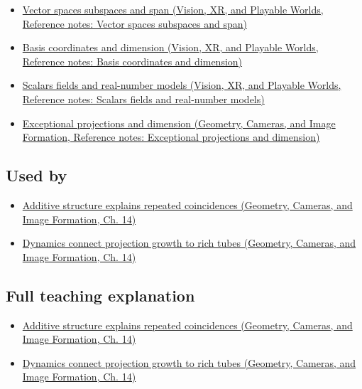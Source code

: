 \begin{itemize}
\tightlist
\item
  \href{../07-Vision-XR-and-Playable-Worlds/main.pdf\#nameddest=appendix-173b52c063ae}{Vector spaces subspaces and span (Vision, XR, and Playable Worlds, Reference notes: Vector spaces subspaces and span)}
\item
  \href{../07-Vision-XR-and-Playable-Worlds/main.pdf\#nameddest=appendix-ce0341f7ea0d}{Basis coordinates and dimension (Vision, XR, and Playable Worlds, Reference notes: Basis coordinates and dimension)}
\item
  \href{../07-Vision-XR-and-Playable-Worlds/main.pdf\#nameddest=appendix-52051ad550fe}{Scalars fields and real-number models (Vision, XR, and Playable Worlds, Reference notes: Scalars fields and real-number models)}
\item
  \href{../03-Geometry-Cameras-and-Image-Formation/main.pdf\#nameddest=appendix-3c73f7862157}{Exceptional projections and dimension (Geometry, Cameras, and Image Formation, Reference notes: Exceptional projections and dimension)}
\end{itemize}

\subsection{Used by}\label{appendix-b0732b22e7d6-used-by}

\begin{itemize}
\tightlist
\item
  \href{../03-Geometry-Cameras-and-Image-Formation/main.pdf\#nameddest=04-visual-computing-ii-ch033-additive-structure-explains-repeated-coincidences}{Additive structure explains repeated coincidences (Geometry, Cameras, and Image Formation, Ch. 14)}
\item
  \href{../03-Geometry-Cameras-and-Image-Formation/main.pdf\#nameddest=04-visual-computing-ii-ch033-dynamics-connect-projection-growth-to-rich-tubes}{Dynamics connect projection growth to rich tubes (Geometry, Cameras, and Image Formation, Ch. 14)}
\end{itemize}

\subsection{Full teaching explanation}\label{appendix-b0732b22e7d6-full-teaching-explanation}

\begin{itemize}
\tightlist
\item
  \href{../03-Geometry-Cameras-and-Image-Formation/main.pdf\#nameddest=04-visual-computing-ii-ch033-additive-structure-explains-repeated-coincidences}{Additive structure explains repeated coincidences (Geometry, Cameras, and Image Formation, Ch. 14)}
\item
  \href{../03-Geometry-Cameras-and-Image-Formation/main.pdf\#nameddest=04-visual-computing-ii-ch033-dynamics-connect-projection-growth-to-rich-tubes}{Dynamics connect projection growth to rich tubes (Geometry, Cameras, and Image Formation, Ch. 14)}
\end{itemize}

